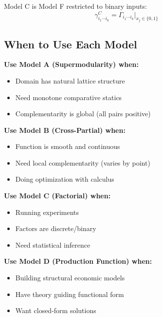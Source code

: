 \begin{theorem}
\label{thm:cf-equiv}
Model C is Model F restricted to binary inputs:
\begin{equation}
\gamma^C_{i_1 \cdots i_k} = \Gamma_{i_1 \cdots i_k} \big|_{x_j \in \{0,1\}}
\end{equation}
\end{theorem}

\subsection{When to Use Each Model}

\begin{tcolorbox}[colback=yellow!5!white,colframe=yellow!75!black,title=\textbf{Model Selection Guide}]

\textbf{Use Model A (Supermodularity) when:}
\begin{itemize}[noitemsep]
    \item Domain has natural lattice structure
    \item Need monotone comparative statics
    \item Complementarity is global (all pairs positive)
\end{itemize}

\textbf{Use Model B (Cross-Partial) when:}
\begin{itemize}[noitemsep]
    \item Function is smooth and continuous
    \item Need local complementarity (varies by point)
    \item Doing optimization with calculus
\end{itemize}

\textbf{Use Model C (Factorial) when:}
\begin{itemize}[noitemsep]
    \item Running experiments
    \item Factors are discrete/binary
    \item Need statistical inference
\end{itemize}

\textbf{Use Model D (Production Function) when:}
\begin{itemize}[noitemsep]
    \item Building structural economic models
    \item Have theory guiding functional form
    \item Want closed-form solutions
\end{itemize}


\end{tcolorbox}
